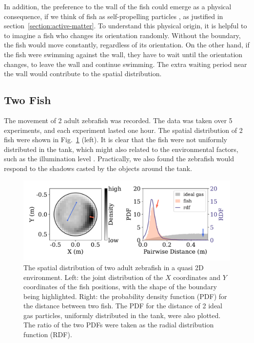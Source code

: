 \documentclass[11pt,twoside]{report}
\begin{document}
In addition, the preference to the wall of the fish could emerge as a physical consequence, if we think of fish as self-propelling particles \cite{lee2013, maggi2015, bechinger2016}, as justified in section~\ref{section:active-matter}. To understand this physical origin, it is helpful to to imagine a fish who changes its orientation randomly. Without the boundary, the fish would move constantly, regardless of its orientation. On the other hand, if the fish were swimming against the wall, they have to wait until the orientation changes, to leave the wall and continue swimming. The extra waiting period near the wall would contribute to the spatial distribution.



\subsection{Two Fish}
\label{section:fish_2_2d}

The movement of 2 adult zebrafish was recorded. The data was taken over 5 experiments, and each experiment lasted one hour.
The spatial distribution of 2 fish were shown in Fig.~\ref{fig:density_2d_fish_2} (left). It is clear that the fish were not uniformly distributed in the tank, which might also related to the environmental factors, such as the illumination level \cite{makris2006, rosemberg2011, shelton2020}. Practically, we also found the zebrafish would respond to the shadows casted by the objects around the tank.

\begin{figure}
  \includegraphics[width=\linewidth]{dist-2-fish}
  \caption[The 2D spatial distribution of two fish]{The spatial distribution of two adult zebrafish in a quasi 2D environment. Left: the joint distribution of the $X$ coordinates and $Y$ coordinates of the fish positions, with the shape of the boundary being highlighted.
  Right: the probability density function (PDF) for the distance between two fish. The PDF for the distance of 2 ideal gas particles, uniformly distributed in the tank, were also plotted. The ratio of the two \gls{PDF}s were taken as the radial distribution function (RDF).}
  \label{fig:density_2d_fish_2}
\end{figure}
\end{document}
